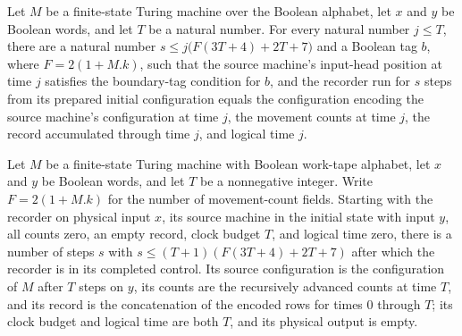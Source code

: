 \begin{lemma}
\label{Complexity.clRec_prefix}
\leanok
{}
Let $M$ be a finite-state Turing machine over the Boolean alphabet, let $x$ and $y$ be
Boolean words, and let $T$ be a natural number. For every natural number $j\le T$, there
are a natural number $s\le j\bigl(F(3T+4)+2T+7\bigr)$ and a Boolean tag $b$, where
$F=2(1+M.k)$, such that the source machine's input-head position at time $j$ satisfies
the boundary-tag condition for $b$, and the recorder run for $s$ steps from its prepared
initial configuration equals the configuration encoding the source machine's
configuration at time $j$, the movement counts at time $j$, the record accumulated
through time $j$, and logical time $j$.
\end{lemma}

\begin{lemma}
\label{Complexity.clRec_complete}
\leanok
{}
Let $M$ be a finite-state Turing machine with Boolean work-tape alphabet, let $x$ and
$y$ be Boolean words, and let $T$ be a nonnegative integer. Write $F=2(1+M.k)$ for the
number of movement-count fields. Starting with the recorder on physical input $x$, its
source machine in the initial state with input $y$, all counts zero, an empty record,
clock budget $T$, and logical time zero, there is a number of steps $s$ with $s\le
(T+1)(F(3T+4)+2T+7)$ after which the recorder is in its completed control. Its source
configuration is the configuration of $M$ after $T$ steps on $y$, its counts are the
recursively advanced counts at time $T$, and its record is the concatenation of the
encoded rows for times $0$ through $T$; its clock budget and logical time are both $T$,
and its physical output is empty.
\end{lemma}

